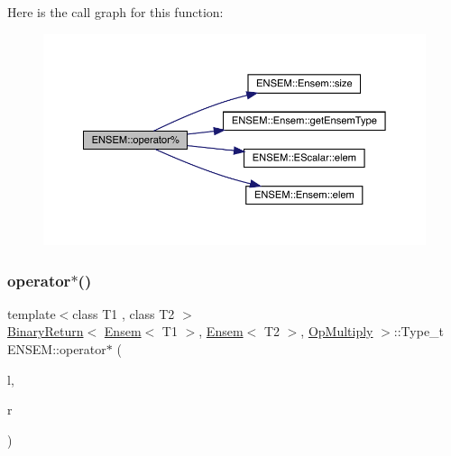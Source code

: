 Here is the call graph for this function\+:\nopagebreak
\begin{figure}[H]
\begin{center}
\leavevmode
\includegraphics[width=350pt]{d1/d9e/group__eensem_ga00d0a959bef6d8cd4aa976de1482281d_cgraph}
\end{center}
\end{figure}
\mbox{\label{group__eensem_gacf3333408054c89c251c9c44d25fa321}} 
\subsubsection{\texorpdfstring{operator$\ast$()}{operator*()}\hspace{0.1cm}{\footnotesize\ttfamily [1/11]}}
{\footnotesize\ttfamily template$<$class T1 , class T2 $>$ \\
\mbox{\hyperlink{structENSEM_1_1BinaryReturn}{Binary\+Return}}$<$ \mbox{\hyperlink{classENSEM_1_1Ensem}{Ensem}}$<$ T1 $>$, \mbox{\hyperlink{classENSEM_1_1Ensem}{Ensem}}$<$ T2 $>$, \mbox{\hyperlink{structENSEM_1_1OpMultiply}{Op\+Multiply}} $>$\+::Type\+\_\+t E\+N\+S\+E\+M\+::operator$\ast$ (\begin{DoxyParamCaption}\item[{const \mbox{\hyperlink{classENSEM_1_1Ensem}{Ensem}}$<$ T1 $>$ \&}]{l,  }\item[{const \mbox{\hyperlink{classENSEM_1_1Ensem}{Ensem}}$<$ T2 $>$ \&}]{r }\end{DoxyParamCaption})\hspace{0.3cm}{\ttfamily [inline]}}

